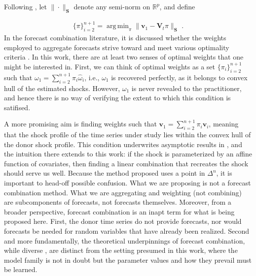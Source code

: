 \documentclass[11pt]{article}
\newcommand{\V}{\textbf{V}}
\newcommand{\weight}{\pi}
\DeclareMathOperator*{\argmin}{arg\,min} %
\theoremstyle{definition}
\begin{document}
    Following \citet{abadie2003economic,abadie2010synthetic}, let $\|\cdot\|_{\textbf{S}}$ denote any semi-norm on $\mathbb{R}^{p}$, and define

    \begin{align*}
    \{\pi\}_{i=2}^{n+1} = \argmin_{\pi}\|\textbf{v}_{1} - \V_{t}\pi \|_{\textbf{S}} \text{ .}
    \end{align*}
In the forecast combination literature, it is discussed whether the weights employed to aggregate forecasts strive toward and meet various optimality criteria \citep{timmermann2006forecast,wang2023forecast}.  In this work, there are at least two senses of optimal weights that one might be interested in.  First, we can think of optimal weights as a set $\{\weight_{i}\}_{i=2}^{n+1}$ such that $\omega_{1} = \sum^{n+1}_{i=2}\weight_{i}\hat\omega_{i}$, i.e., $\omega_{1}$ is recovered perfectly, as it belongs to convex hull of the estimated shocks. However, $\omega_{1}$ is never revealed to the practitioner, and hence there is no way of verifying the extent to which this condition is satifised.

A more promising aim is finding weights such that $\textbf{v}_{1} = \sum^{n+1}_{i=2}\weight_{i}\textbf{v}_{i}$, meaning that the shock profile of the time series under study lies within the convex hull of the donor shock profile.  This condition underwrites asymptotic results in \citet{abadie2010synthetic}, and the intuition there extends to this work: if the shock is parameterized by an affine function of covariates, then finding a linear combination that recreates the shock should serve us well.  Because the method proposed uses a point in $\Delta^{n}$, it is important to head-off possible confusion.  What we are proposing is not a forecast combination method.  What we are aggregating and weighting (not combining) are subcomponents of forecasts, not forecasts themselves.  Moreover, from a broader perspective, forecast combination is an inapt term for what is being proposed here.  First, the donor time series do not provide forecasts, nor would forecasts be needed for random variables that have already been realized.  Second and more fundamentally, the theoretical underpinnings of forecast combination, while diverse \citep{wang2023forecast}, are distinct from the setting presumed in this work, where the model family is not in doubt but the parameter values and how they prevail must be learned.
\end{document}
